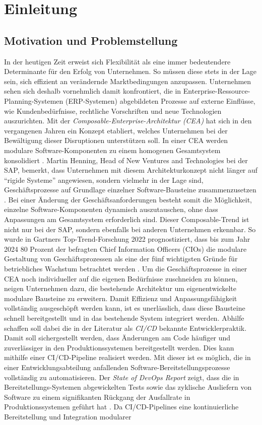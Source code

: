 \section{Einleitung}

\subsection{Motivation und Problemstellung}
In der heutigen Zeit erweist sich Flexibilität als eine immer bedeutendere Determinante für den Erfolg von Unternehmen. So müssen diese stets in der Lage sein, sich effizient an verändernde Marktbedingungen anzupassen. Unternehmen sehen sich deshalb vornehmlich damit konfrontiert, die in Enterprise-Ressource-Planning-Systemen (\acs{ERP}-Systemen) abgebildeten Prozesse auf externe Einflüsse, wie Kundenbedürfnisse, rechtliche Vorschriften und neue Technologien auszurichten. Mit der \textit{Composable-Enterprise-Architektur (CEA)} hat sich in den vergangenen Jahren ein Konzept etabliert, welches Unternehmen bei der Bewältigung dieser Disruptionen unterstützen soll. In einer CEA werden modulare Software-Komponenten zu einem homogenen Gesamtsystem konsolidiert \cite{.20230313}. Martin Henning, Head of New Ventures and Technologies bei der SAP, bemerkt, dass Unternehmen mit diesem Architekturkonzept nicht länger auf \enquote{rigide Systeme} angewiesen, sondern vielmehr in der Lage sind, Geschäftsprozesse auf Grundlage einzelner Software-Bausteine zusammenzusetzen \cite{Galer.20221019}. Bei einer Änderung der Geschäftsanforderungen besteht somit die Möglichkeit, einzelne Software-Komponenten dynamisch auszutauschen, ohne dass Anpassungen am Gesamtsystem erforderlich sind. Dieser Composable-Trend ist nicht nur bei der SAP, sondern ebenfalls bei anderen Unternehmen erkennbar. So wurde in Gartners Top-Trend-Forschung 2022 prognostiziert, dass bis zum Jahr 2024 80 Prozent der befragten Chief Information Officers (\acs{CIO}s) die modulare Gestaltung von Geschäftsprozessen als eine der fünf wichtigsten Gründe für betriebliches Wachstum betrachtet werden \cite{Gartner.20230408}. Um die Geschäftsprozesse in einer CEA noch individueller auf die eigenen Bedürfnisse zuschneiden zu können, neigen Unternehmen dazu, die bestehende Architektur um eigenentwickelte modulare Bausteine zu erweitern. Damit Effizienz und Anpassungsfähigkeit vollständig ausgeschöpft werden kann, ist es unerlässlich, dass diese Bausteine schnell bereitgestellt und in das bestehende System integriert werden. Abhilfe schaffen soll dabei die in der Literatur als \textit{\ac{CI/CD}} bekannte Entwicklerpraktik. Damit soll sichergestellt werden, dass Änderungen am Code häufiger und zuverlässiger in den Produktionssystemen bereitgestellt werden. Dies kann mithilfe einer CI/CD-Pipeline realisiert werden. Mit dieser ist es möglich, die in einer Entwicklungsabteilung anfallenden Software-Bereitstellungsprozesse vollständig zu automatisieren. Der \textit{State of DevOps Report} zeigt, dass die in Bereitstellungs-Systemen abgewickelten Tests sowie das zyklische Ausliefern von Software zu einem signifikanten Rückgang der Ausfallrate in Produktionssystemen geführt hat \cite{GoogleCloud.20230313}. Da CI/CD-Pipelines eine kontinuierliche Bereitstellung und Integration modularer 
